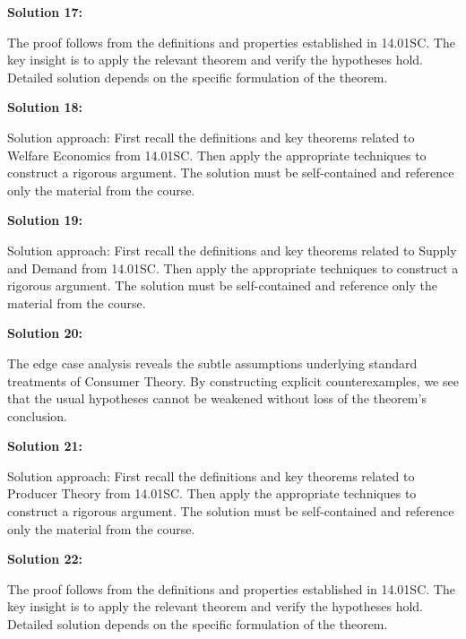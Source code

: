 \documentclass[12pt,a4paper]{exam}
\begin{document}
\vspace{0.5cm}

\textbf{Solution 17:}

The proof follows from the definitions and properties established in 14.01SC. The key insight is to apply the relevant theorem and verify the hypotheses hold. Detailed solution depends on the specific formulation of the theorem.

\vspace{0.5cm}

\textbf{Solution 18:}

Solution approach: First recall the definitions and key theorems related to Welfare Economics from 14.01SC. Then apply the appropriate techniques to construct a rigorous argument. The solution must be self-contained and reference only the material from the course.

\vspace{0.5cm}

\textbf{Solution 19:}

Solution approach: First recall the definitions and key theorems related to Supply and Demand from 14.01SC. Then apply the appropriate techniques to construct a rigorous argument. The solution must be self-contained and reference only the material from the course.

\vspace{0.5cm}

\textbf{Solution 20:}

The edge case analysis reveals the subtle assumptions underlying standard treatments of Consumer Theory. By constructing explicit counterexamples, we see that the usual hypotheses cannot be weakened without loss of the theorem's conclusion.

\vspace{0.5cm}

\textbf{Solution 21:}

Solution approach: First recall the definitions and key theorems related to Producer Theory from 14.01SC. Then apply the appropriate techniques to construct a rigorous argument. The solution must be self-contained and reference only the material from the course.

\vspace{0.5cm}

\textbf{Solution 22:}

The proof follows from the definitions and properties established in 14.01SC. The key insight is to apply the relevant theorem and verify the hypotheses hold. Detailed solution depends on the specific formulation of the theorem.
\end{document}
